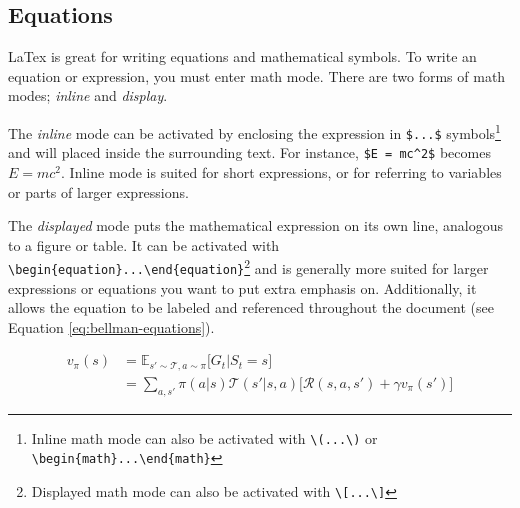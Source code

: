 \subsection{Equations}
\label{app:equations}

LaTex is great for writing equations and mathematical symbols. 
To write an equation or expression, you must enter math mode.
There are two forms of math modes; \textit{inline} and \textit{display}.

The \textit{inline} mode can be activated by enclosing the expression in \verb|$...$| symbols\footnote{Inline math mode can also be activated with \verb|\(...\)| or \verb|\begin{math}...\end{math}|} and will placed inside the surrounding text.
For instance, \verb|$E = mc^2$| becomes $E=mc^2$.
Inline mode is suited for short expressions, or for referring to variables or parts of larger expressions.

The \textit{displayed} mode puts the mathematical expression on its own line, analogous to a figure or table.
It can be activated with \verb|\begin{equation}...\end{equation}|\footnote{Displayed math mode can also be activated with \verb|\[...\]|} and is generally more suited for larger expressions or equations you want to put extra emphasis on.
Additionally, it allows the equation to be labeled and referenced throughout the document (see Equation \ref{eq:bellman-equations}).

\begin{equation}
    \begin{split}
        v_\pi(s) & = \mathbb{E}_{s' \sim \mathcal{T}, a \sim \pi} \big[ G_t | S_t = s \big] \\ 
                 & = \sum_{a,s'}
                    {
                        \pi(a|s) \mathcal{T}(s'|s,a) 
                        \big[ 
                            \mathcal{R}(s, a, s') + \gamma v_\pi(s') 
                        \big]
                    } 
    \end{split}
    \label{eq:bellman-equations}
\end{equation}

